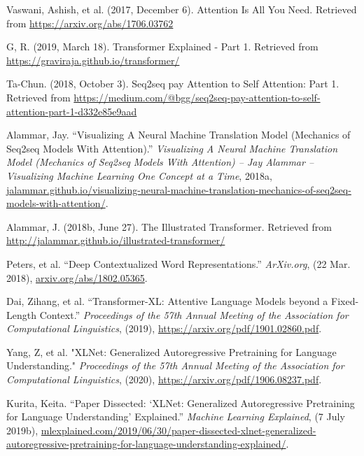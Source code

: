 \begin{enumerateSpaced}{4pt}
    \item Vaswani, Ashish, et al. (2017, December 6). Attention Is All You Need. Retrieved from \url{https://arxiv.org/abs/1706.03762}
    
    \item G, R. (2019, March 18). Transformer Explained - Part 1. Retrieved from \url{https://graviraja.github.io/transformer/}
    
    \item Ta-Chun. (2018, October 3). Seq2seq pay Attention to Self Attention: Part 1. Retrieved from \url{https://medium.com/@bgg/seq2seq-pay-attention-to-self-attention-part-1-d332e85e9aad}
    
    \item Alammar, Jay. “Visualizing A Neural Machine Translation Model (Mechanics of Seq2seq Models With Attention).” \emph{Visualizing A Neural Machine Translation Model (Mechanics of Seq2seq Models With Attention) – Jay Alammar – Visualizing Machine Learning One Concept at a Time}, 2018a, \url{jalammar.github.io/visualizing-neural-machine-translation-mechanics-of-seq2seq-models-with-attention/}.
    
    \item Alammar, J. (2018b, June 27). The Illustrated Transformer. Retrieved from \url{http://jalammar.github.io/illustrated-transformer/}


    \item Peters, et al. “Deep Contextualized Word Representations.” \emph{ArXiv.org}, (22 Mar. 2018), \url{arxiv.org/abs/1802.05365}.
    
    \item Dai, Zihang, et al. “Transformer-XL: Attentive Language Models beyond a Fixed-Length Context.” \emph{Proceedings of the 57th Annual Meeting of the Association for Computational Linguistics}, (2019), \url{https://arxiv.org/pdf/1901.02860.pdf}.
    
    \item Yang, Z, et al. "XLNet: Generalized Autoregressive Pretraining for Language Understanding." \emph{Proceedings of the 57th Annual Meeting of the Association for Computational Linguistics}, (2020), \url{https://arxiv.org/pdf/1906.08237.pdf}.
    
    \item Kurita, Keita. “Paper Dissected: ‘XLNet: Generalized Autoregressive Pretraining for Language Understanding’ Explained.” \emph{Machine Learning Explained}, (7 July 2019b), \url{mlexplained.com/2019/06/30/paper-dissected-xlnet-generalized-autoregressive-pretraining-for-language-understanding-explained/}.
    

\end{enumerateSpaced}
